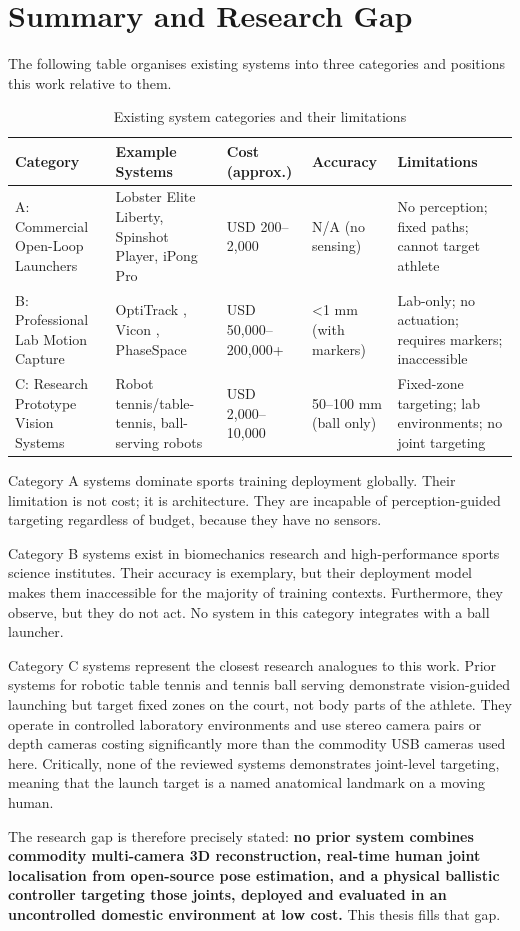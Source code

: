 \section{Summary and Research Gap}

The following table organises existing systems into three categories and positions this work relative to them.

\begin{table}[htbp]
\caption{Existing system categories and their limitations}
\label{tab:2_1}
\begin{tabular}{|p{2cm}|p{3cm}|p{1.8cm}|p{1.8cm}|p{3.5cm}|}
\hline
\textbf{Category} & \textbf{Example Systems} & \textbf{Cost (approx.)} & \textbf{Accuracy} & \textbf{Limitations} \\
\hline
A: Commercial Open-Loop Launchers & Lobster Elite Liberty, Spinshot Player, iPong Pro & USD 200--2,000 & N/A (no sensing) & No perception; fixed paths; cannot target athlete \\
\hline
B: Professional Lab Motion Capture & OptiTrack \cite{ref30}, Vicon \cite{ref8}, PhaseSpace \cite{ref31} & USD 50,000--200,000+ & \textless{}1 mm (with markers) & Lab-only; no actuation; requires markers; inaccessible \\
\hline
C: Research Prototype Vision Systems & Robot tennis/table-tennis, ball-serving robots & USD 2,000--10,000 & 50--100 mm (ball only) & Fixed-zone targeting; lab environments; no joint targeting \\
\hline
\end{tabular}
\end{table}

Category A systems dominate sports training deployment globally. Their limitation is not cost; it is architecture. They are incapable of perception-guided targeting regardless of budget, because they have no sensors.

Category B systems exist in biomechanics research and high-performance sports science institutes. Their accuracy is exemplary, but their deployment model makes them inaccessible for the majority of training contexts. Furthermore, they observe, but they do not act. No system in this category integrates with a ball launcher.

Category C systems represent the closest research analogues to this work. Prior systems for robotic table tennis \cite{ref24} and tennis ball serving \cite{ref25} demonstrate vision-guided launching but target fixed zones on the court, not body parts of the athlete. They operate in controlled laboratory environments and use stereo camera pairs or depth cameras costing significantly more than the commodity USB cameras used here. Critically, none of the reviewed systems demonstrates joint-level targeting, meaning that the launch target is a named anatomical landmark on a moving human.

The research gap is therefore precisely stated: \textbf{no prior system combines commodity multi-camera 3D reconstruction, real-time human joint localisation from open-source pose estimation, and a physical ballistic controller targeting those joints, deployed and evaluated in an uncontrolled domestic environment at low cost.} This thesis fills that gap.
